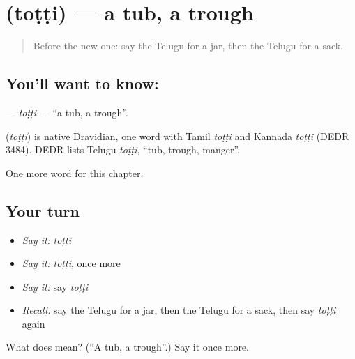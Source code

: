 \section[\texorpdfstring{\te{తొట్టి} (toṭṭi)}{తొట్టి (toṭṭi)}]{ (toṭṭi) — a tub, a trough}

\label{lesson:TE-C232-totti}



\begin{quote}
Before the new one: say the Telugu for a jar, then the Telugu for a sack.
\end{quote}

\subsection*{You'll want to know: }
\textbf{} — \emph{toṭṭi} — \textquotedblleft{}a tub, a trough\textquotedblright{}.

\begin{cousinweb}
\textbf{} (\emph{toṭṭi}) is native Dravidian, one word with Tamil \emph{toṭṭi} and Kannada \emph{toṭṭi} (DEDR 3484). DEDR lists Telugu \emph{toṭṭi}, \textquotedblleft{}tub, trough, manger\textquotedblright{}.
\end{cousinweb}

\begin{grammarlens}[title={What you've built}]
One more word for this chapter.
\end{grammarlens}

\subsection*{Your turn}
\begin{itemize}
\raggedright
  \item \emph{Say it:} \emph{toṭṭi}
  \item \emph{Say it:} \emph{toṭṭi}, once more
  \item \emph{Say it:} say \emph{toṭṭi}
  \item \emph{Recall:} say the Telugu for a jar, then the Telugu for a sack, then say \emph{toṭṭi} again
\end{itemize}

\begin{tcolorbox}[breakable,colback=teal!4,colframe=teal!35!black,title={Before you move on}]
What does  mean? (\textquotedblleft{}A tub, a trough\textquotedblright{}.) Say it once more.
\end{tcolorbox}
